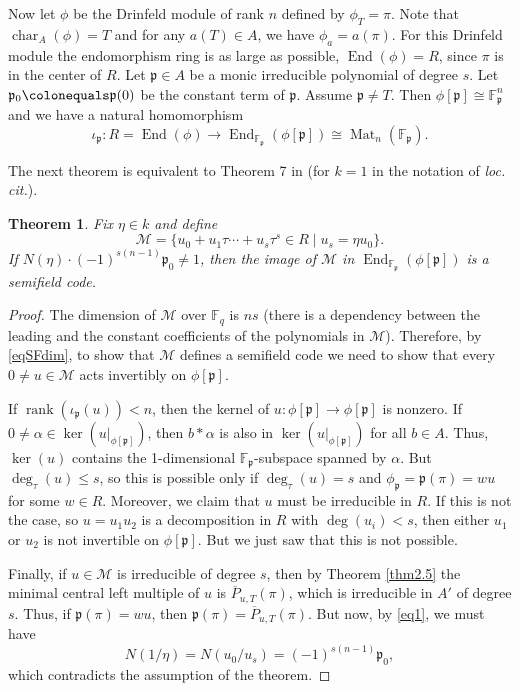 \documentclass[12pt]{amsart}
\newtheorem{thm}{Theorem}[section]
\theoremstyle{definition}
\theoremstyle{remark}
\numberwithin{equation}{section}
\numberwithin{thm}{section}
\DeclareMathOperator{\End}{End}
\DeclareMathOperator{\rank}{rank}
\DeclareMathOperator{\chr}{char}
\DeclareMathOperator{\Mat}{Mat}
\newcommand{\fp}{\mathfrak{p}}
\newcommand{\cM}{\mathcal{M}}
\newcommand{\F}{\mathbb{F}}
\newcommand{\To}{\longrightarrow}
\begin{document}




Now let $\phi$ be the Drinfeld module of rank $n$ defined by $\phi_T=\pi$. Note that $\chr_A(\phi)=T$ and for any $a(T)\in A$, we have $\phi_a=a(\pi)$. 
For this Drinfeld module the endomorphism ring is as large as possible, $\End(\phi)=R$, since $\pi$ 
is in the center of $R$. Let $\fp\in  A$ be a monic irreducible polynomial of degree $s$. Let $\fp_0\colonequals \fp(0)$ be the constant term of $\fp$. 
Assume $\fp\neq T$. Then $\phi[\fp]\cong \F_\fp^n$ and we have a natural homomorphism 
$$
\iota_\fp\colon R=\End(\phi)\To \End_{\F_\fp}(\phi[\fp])\cong \Mat_n(\F_\fp). 
$$

The next theorem is equivalent to Theorem 7 in \cite{Sheekey} (for $k=1$ in the notation of \textit{loc. cit.}).  

\begin{thm}\label{thm7} 
	Fix $\eta\in k$ and define 
	$$
	\cM = \{u_0+u_1\tau\cdots+u_s\tau^s\in R\mid  u_s=\eta u_0\}. 
	$$
	If $N(\eta)\cdot (-1)^{s(n-1)}\fp_0\neq 1$, then the image of $\cM$ in $\End_{\F_\fp}(\phi[\fp])$ 
	is a semifield code. 
\end{thm}
\begin{proof}
	The dimension of $\cM$ over $\F_q$ is $ns$ (there is a dependency between the leading and the constant coefficients of the 
	polynomials in $\cM$). Therefore, by \eqref{eqSFdim}, to show that $\cM$ defines a semifield code 
	we need to show that every $0\neq u\in \cM$ acts invertibly on $\phi[\fp]$. 
	
	If $\rank(\iota_\fp(u))<n$, then the kernel of $u\colon \phi[\fp]\to \phi[\fp]$ is nonzero. If $0\neq \alpha\in \ker(u|_{\phi[\fp]})$, then $b\ast \alpha$ 
	is also in $\ker(u|_{\phi[\fp]})$ for all $b\in A$. Thus, $\ker(u)$ contains the 1-dimensional $\F_\fp$-subspace spanned by $\alpha$. But $\deg_\tau(u)\leq s$, 
	so this is possible only if $\deg_\tau(u)=s$ and $\phi_\fp=\fp(\pi)=wu$ for some $w\in R$. Moreover, we claim that $u$ must be irreducible in $R$. 
	If this is not the case, so $u=u_1u_2$ is a decomposition in $R$ with $\deg(u_i)<s$, then either $u_1$ or $u_2$ is not invertible on $\phi[\fp]$. But we just saw that 
	this is not possible. 
	
	Finally, if $u\in \cM$ is irreducible of degree $s$, then by Theorem \ref{thm2.5} the minimal central left multiple of $u$ is $\overline{P}_{u, T}(\pi)$, which is 
	irreducible in $A'$ of degree $s$. Thus, if $\fp(\pi)=wu$, then $\fp(\pi)=\overline{P}_{u, T}(\pi)$. But now, by \eqref{eq1}, we must have 
	$$
	N(1/\eta)=N(u_0/u_s)=(-1)^{s(n-1)}\fp_0,
	$$ 
	which contradicts the assumption of the theorem. 
\end{proof}
\end{document}
